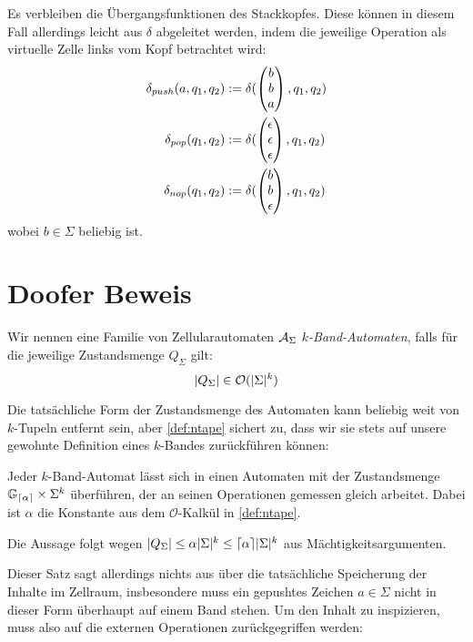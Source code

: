 \documentclass{article}
\begin{document}
Es verbleiben die Übergangsfunktionen des Stackkopfes. Diese können in diesem Fall allerdings leicht aus $\delta$ abgeleitet werden, indem die jeweilige Operation als virtuelle Zelle links vom Kopf betrachtet wird:
\begin{align*}
    \delta_{push}(a, q_1, q_2) &:= \delta(\begin{pmatrix}b\\b\\a\end{pmatrix}, q_1, q_2) \\
    \delta_{pop}(q_1, q_2) &:= \delta(\begin{pmatrix}\epsilon\\\epsilon\\\epsilon\end{pmatrix}, q_1, q_2) \\
    \delta_{nop}(q_1, q_2) &:= \delta(\begin{pmatrix}b\\b\\\epsilon\end{pmatrix}, q_1, q_2) \\
\end{align*}
wobei $b \in \Sigma$ beliebig ist.


\section{Doofer Beweis}

\begin{definition}
    Wir nennen eine Familie von Zellularautomaten $\mathcal{A}_\Sigma$ \emph{$k$-Band-Automaten}, falls für die jeweilige Zustandsmenge $Q_\Sigma$ gilt:
    \begin{equation}
        \lvert Q_\Sigma\rvert \in \mathcal{O}(\lvert\Sigma\rvert^k) \label{def:ntape}
    \end{equation}
\end{definition}

Die tatsächliche Form der Zustandsmenge des Automaten kann beliebig weit von $k$-Tupeln entfernt sein, aber \eqref{def:ntape} sichert zu, dass wir sie stets auf unsere gewohnte Definition eines $k$-Bandes zurückführen können:

\begin{satz}
    \label{thm:tape-hom}
    Jeder $k$-Band-Automat lässt sich in einen Automaten mit der Zustandsmenge $\mathbb{G}_{\lceil\alpha\rceil} \times \Sigma^k$ überführen, der an seinen Operationen gemessen gleich arbeitet. Dabei ist $\alpha$ die Konstante aus dem $\mathcal{O}$-Kalkül in \eqref{def:ntape}.

    \begin{beweis}
        Die Aussage folgt wegen $\lvert Q_\Sigma\rvert \leq \alpha \lvert\Sigma\rvert^k \leq \lceil\alpha\rceil \lvert\Sigma\rvert^k$ aus Mächtigkeitsargumenten.
    \end{beweis}
\end{satz}

Dieser Satz sagt allerdings nichts aus über die tatsächliche Speicherung der Inhalte im Zellraum, insbesondere muss ein gepushtes Zeichen $a \in \Sigma$ nicht in dieser Form überhaupt auf einem Band stehen. Um den Inhalt zu inspizieren, muss also auf die externen Operationen zurückgegriffen werden:
\end{document}

